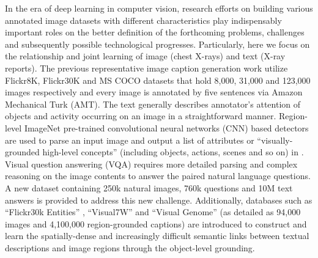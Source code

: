 \documentclass[10pt,twocolumn,letterpaper]{article}
\begin{document}
In the era of deep learning in computer vision, research efforts on building various annotated image datasets \cite{Russakovsky2015,Everingham2015,Lin2014COCO,Antol2015VQA,Plummer2015Flickr30k,Zhu2016Visual7W,Johnson2016DenseCap,krishnavisualgenome} with different characteristics play indispensably important roles on the better definition of the forthcoming problems, challenges and subsequently possible technological progresses. Particularly, here we focus on the relationship and joint learning of image (chest X-rays) and text (X-ray reports). The previous representative image caption generation work \cite{Vinyals2015Show,Karpathy2015Deep} utilize Flickr8K, Flickr30K \cite{Young2014From} and MS COCO \cite{Lin2014COCO} datasets that hold 8,000, 31,000 and 123,000 images respectively and every image is annotated by five sentences via Amazon Mechanical Turk (AMT). The text generally describes annotator's attention of objects and activity occurring on an image in a straightforward manner. Region-level ImageNet pre-trained convolutional neural networks (CNN) based detectors are used to parse an input image and output a list of attributes or ``visually-grounded high-level concepts'' (including objects, actions, scenes and so on) in \cite{Karpathy2015Deep,Wu2016Ask}. Visual question answering (VQA) requires more detailed parsing and complex reasoning on the image contents to answer the paired natural language questions. A new dataset containing 250k natural images, 760k questions and 10M text answers \cite{Antol2015VQA} is provided to address this new challenge. Additionally, databases such as ``Flickr30k Entities'' \cite{Plummer2015Flickr30k}, ``Visual7W'' \cite{Zhu2016Visual7W} and ``Visual Genome'' \cite{krishnavisualgenome,Johnson2016DenseCap} (as detailed as 94,000 images and 4,100,000 region-grounded captions) are introduced to construct and learn the spatially-dense and increasingly difficult semantic links between textual descriptions and image regions through the object-level grounding. 
\end{document}
